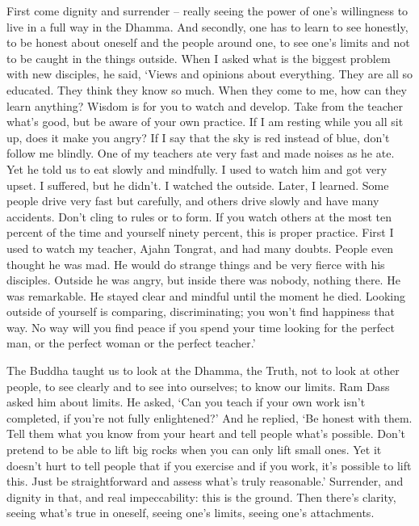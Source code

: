 First come dignity and surrender -- really seeing the power of one's
willingness to live in a full way in the Dhamma. And secondly, one has
to learn to see honestly, to be honest about oneself and the people
around one, to see one's limits and not to be caught in the things
outside. When I asked what is the biggest problem with new disciples, he
said, `Views and opinions about everything. They are all so educated. 
They think they know so much. When they come to me, how can they learn
anything? Wisdom is for you to watch and develop. Take from the teacher
what's good, but be aware of your own practice. If I am resting while
you all sit up, does it make you angry? If I say that the sky is red
instead of blue, don't follow me blindly. One of my teachers ate very
fast and made noises as he ate. Yet he told us to eat slowly and
mindfully. I used to watch him and got very upset. I suffered, but he
didn't. I watched the outside. Later, I learned. Some people drive very
fast but carefully, and others drive slowly and have many accidents. 
Don't cling to rules or to form. If you watch others at the most ten
percent of the time and yourself ninety percent, this is proper
practice. First I used to watch my teacher, Ajahn Tongrat, and had many
doubts. People even thought he was mad. He would do strange things and
be very fierce with his disciples. Outside he was angry, but inside
there was nobody, nothing there. He was remarkable. He stayed clear and
mindful until the moment he died. Looking outside of yourself is
comparing, discriminating; you won't find happiness that way. No way
will you find peace if you spend your time looking for the perfect man, 
or the perfect woman or the perfect teacher.'

The Buddha taught us to look at the Dhamma, the Truth, not to look at
other people, to see clearly and to see into ourselves; to know our
limits. Ram Dass asked him about limits. He asked, `Can you teach if
your own work isn't completed, if you're not fully enlightened?' And he
replied, `Be honest with them. Tell them what you know from your heart
and tell people what's possible. Don't pretend to be able to lift big
rocks when you can only lift small ones. Yet it doesn't hurt to tell
people that if you exercise and if you work, it's possible to lift this. 
Just be straightforward and assess what's truly reasonable.' Surrender, 
and dignity in that, and real impeccability: this is the ground. Then
there's clarity, seeing what's true in oneself, seeing one's limits, 
seeing one's attachments. 

